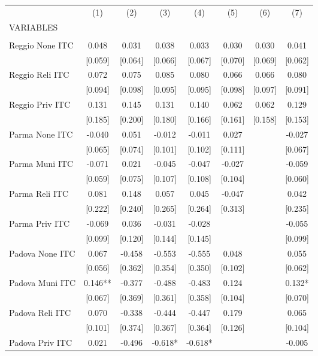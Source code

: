 \begin{tabular}{lccccccc} \hline
 & (1) & (2) & (3) & (4) & (5) & (6) & (7) \\
VARIABLES &  &  &  &  &  &  &  \\ \hline
 &  &  &  &  &  &  &  \\
Reggio None ITC & 0.048 & 0.031 & 0.038 & 0.033 & 0.030 & 0.030 & 0.041 \\
 & [0.059] & [0.064] & [0.066] & [0.067] & [0.070] & [0.069] & [0.062] \\
Reggio Reli ITC & 0.072 & 0.075 & 0.085 & 0.080 & 0.066 & 0.066 & 0.080 \\
 & [0.094] & [0.098] & [0.095] & [0.095] & [0.098] & [0.097] & [0.091] \\
Reggio Priv ITC & 0.131 & 0.145 & 0.131 & 0.140 & 0.062 & 0.062 & 0.129 \\
 & [0.185] & [0.200] & [0.180] & [0.166] & [0.161] & [0.158] & [0.153] \\
Parma None ITC & -0.040 & 0.051 & -0.012 & -0.011 & 0.027 &  & -0.027 \\
 & [0.065] & [0.074] & [0.101] & [0.102] & [0.111] &  & [0.067] \\
Parma Muni ITC & -0.071 & 0.021 & -0.045 & -0.047 & -0.027 &  & -0.059 \\
 & [0.059] & [0.075] & [0.107] & [0.108] & [0.104] &  & [0.060] \\
Parma Reli ITC & 0.081 & 0.148 & 0.057 & 0.045 & -0.047 &  & 0.042 \\
 & [0.222] & [0.240] & [0.265] & [0.264] & [0.313] &  & [0.235] \\
Parma Priv ITC & -0.069 & 0.036 & -0.031 & -0.028 &  &  & -0.055 \\
 & [0.099] & [0.120] & [0.144] & [0.145] &  &  & [0.099] \\
Padova None ITC & 0.067 & -0.458 & -0.553 & -0.555 & 0.048 &  & 0.055 \\
 & [0.056] & [0.362] & [0.354] & [0.350] & [0.102] &  & [0.062] \\
Padova Muni ITC & 0.146** & -0.377 & -0.488 & -0.483 & 0.124 &  & 0.132* \\
 & [0.067] & [0.369] & [0.361] & [0.358] & [0.104] &  & [0.070] \\
Padova Reli ITC & 0.070 & -0.338 & -0.444 & -0.447 & 0.179 &  & 0.065 \\
 & [0.101] & [0.374] & [0.367] & [0.364] & [0.126] &  & [0.104] \\
Padova Priv ITC & 0.021 & -0.496 & -0.618* & -0.618* &  &  & -0.005 \\

\end{tabular}
